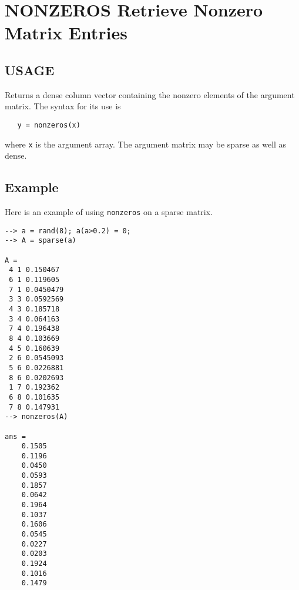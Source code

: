 \section{NONZEROS Retrieve Nonzero Matrix Entries}

\subsection{USAGE}

Returns a dense column vector containing the nonzero elements
of the argument matrix.  The syntax for its use is
\begin{verbatim}
   y = nonzeros(x)
\end{verbatim}
where \verb|x| is the argument array.  The argument matrix may
be sparse as well as dense.
\subsection{Example}

Here is an example of using \verb|nonzeros| on a sparse matrix.
\begin{verbatim}
--> a = rand(8); a(a>0.2) = 0;
--> A = sparse(a)

A = 
 4 1 0.150467
 6 1 0.119605
 7 1 0.0450479
 3 3 0.0592569
 4 3 0.185718
 3 4 0.064163
 7 4 0.196438
 8 4 0.103669
 4 5 0.160639
 2 6 0.0545093
 5 6 0.0226881
 8 6 0.0202693
 1 7 0.192362
 6 8 0.101635
 7 8 0.147931
--> nonzeros(A)

ans = 
    0.1505 
    0.1196 
    0.0450 
    0.0593 
    0.1857 
    0.0642 
    0.1964 
    0.1037 
    0.1606 
    0.0545 
    0.0227 
    0.0203 
    0.1924 
    0.1016 
    0.1479 
\end{verbatim}
